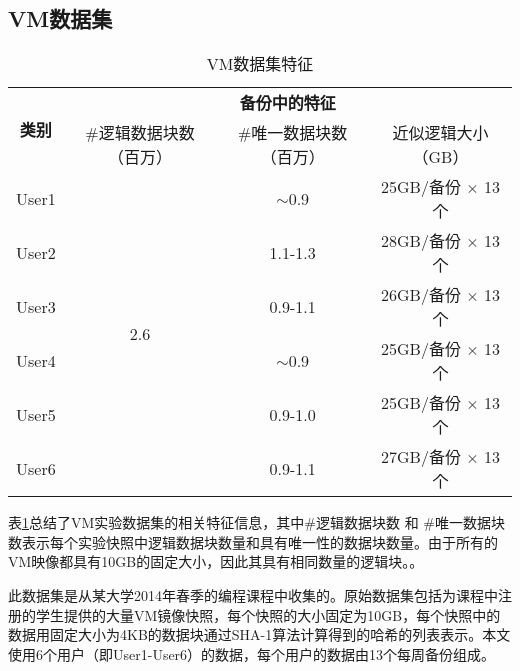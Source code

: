 \subsection{VM数据集}
\label{sec:vm}
\begin{table}[!hbt]
    \caption{VM数据集特征}
\small
\label{tab:VM-dataset}
\renewcommand{\arraystretch}{1.2}
\vspace{-3pt}
\centering
\begin{tabular}{|c|c|c|c|}
\hline
\multirow{2}{*}{\bf 类别} & \multicolumn{3}{c|}{\bf 备份中的特征} \\
\cline{2-4}
    & \#逻辑数据块数（百万） & \#唯一数据块数（百万） & 近似逻辑大小（GB）\\

\hline
User1  &  \multirow{6}{*}{2.6} & $\sim$0.9 & 25GB/备份 $\times$ 13 个 \\
\cline{1-1}
\cline{3-4}
User2 &  & 1.1-1.3 & 28GB/备份 $\times$ 13 个\\
\cline{1-1}
\cline{3-4}
User3 &  & 0.9-1.1 & 26GB/备份 $\times$ 13 个\\
\cline{1-1}
\cline{3-4}
User4 &  & $\sim$0.9 & 25GB/备份 $\times$ 13 个\\
\cline{1-1}
\cline{3-4}
User5 &  & 0.9-1.0 & 25GB/备份 $\times$ 13 个\\
\cline{1-1}
\cline{3-4}
User6 &  & 0.9-1.1 & 27GB/备份 $\times$ 13 个\\
\hline
\end{tabular} 
\end{table}

表\ref{tab:VM-dataset}总结了VM实验数据集的相关特征信息，其中\#逻辑数据块数 和 \#唯一数据块数表示每个实验快照中逻辑数据块数量和具有唯一性的数据块数量。由于所有的VM映像都具有10GB的固定大小，因此其具有相同数量的逻辑块。。

此数据集是从某大学2014年春季的编程课程中收集的。原始数据集包括为课程中注册的学生提供的大量VM镜像快照，每个快照的大小固定为10GB，每个快照中的数据用固定大小为4KB的数据块通过SHA-1算法计算得到的哈希的列表表示。本文使用6个用户（即User1-User6）的数据，每个用户的数据由13个每周备份组成。

